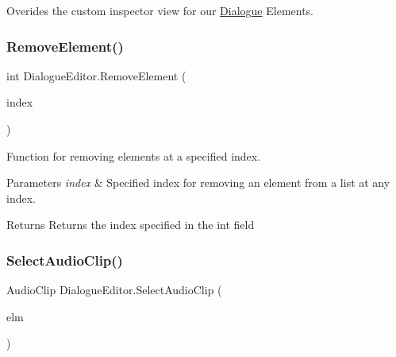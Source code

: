 Overides the custom inspector view for our \mbox{\hyperlink{class_dialogue}{Dialogue}} Elements. 

\mbox{\label{class_dialogue_editor_a4f9858a733113b0dab1177ac806a43d0}} 
\subsubsection{\texorpdfstring{Remove\+Element()}{RemoveElement()}}
{\footnotesize\ttfamily int Dialogue\+Editor.\+Remove\+Element (\begin{DoxyParamCaption}\item[{int}]{index }\end{DoxyParamCaption})\hspace{0.3cm}{\ttfamily [private]}}



Function for removing elements at a specified index. 


\begin{DoxyParams}{Parameters}
{\em index} & Specified index for removing an element from a list at any index.\\
\hline
\end{DoxyParams}
\begin{DoxyReturn}{Returns}
Returns the index specified in the int field
\end{DoxyReturn}
\mbox{\label{class_dialogue_editor_a004ee96b1b14c0daab83f8ca66af7d60}} 
\subsubsection{\texorpdfstring{Select\+Audio\+Clip()}{SelectAudioClip()}}
{\footnotesize\ttfamily Audio\+Clip Dialogue\+Editor.\+Select\+Audio\+Clip (\begin{DoxyParamCaption}\item[{\mbox{\hyperlink{class_dialogue_element}{Dialogue\+Element}}}]{elm }\end{DoxyParamCaption})\hspace{0.3cm}{\ttfamily [private]}}



